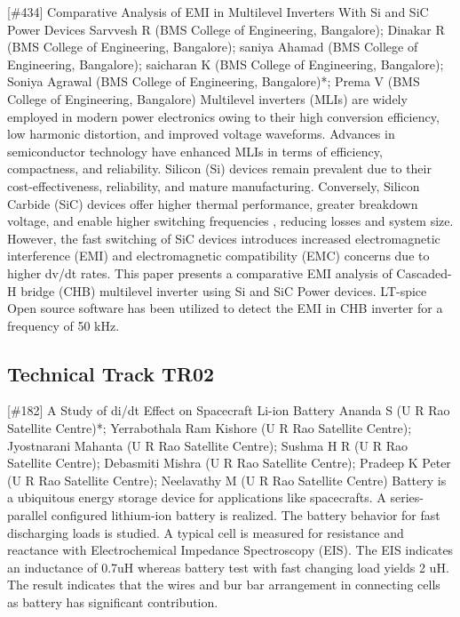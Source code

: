 {} \begin{abstract_online} {[\#434] Comparative Analysis of EMI in Multilevel Inverters With Si and SiC Power Devices} {} {Sarvvesh R (BMS College of Engineering, Bangalore); Dinakar R (BMS College of Engineering, Bangalore); saniya Ahamad (BMS College of Engineering, Bangalore); saicharan K (BMS College of Engineering, Bangalore); Soniya  Agrawal (BMS College of Engineering, Bangalore)*; Prema V (BMS College of Engineering, Bangalore)} {} Multilevel inverters (MLIs) are widely employed in modern power electronics owing to their high conversion efficiency, low harmonic distortion, and improved voltage waveforms. Advances in semiconductor technology have enhanced MLIs in terms of efficiency, compactness, and reliability. Silicon (Si) devices remain prevalent due to their cost-effectiveness, reliability, and mature manufacturing. Conversely, Silicon Carbide (SiC) devices offer higher thermal performance, greater breakdown voltage, and enable higher switching frequencies , reducing losses and system size. However, the fast switching of SiC devices introduces increased electromagnetic interference (EMI) and electromagnetic compatibility (EMC) concerns due to higher dv/dt rates. This paper presents a comparative EMI analysis of Cascaded-H bridge (CHB) multilevel inverter using Si and SiC Power devices. LT-spice Open source software has been utilized to detect the EMI in CHB inverter for a frequency of 50 kHz. \end{abstract_online} 
\clearpage \subsection{Technical Track TR02}\nopagebreak {} \begin{abstract_online} {[\#182] A Study of di/dt Effect on Spacecraft Li-ion Battery} {} {Ananda S (U R Rao Satellite Centre)*; Yerrabothala Ram Kishore (U R Rao Satellite Centre); Jyostnarani Mahanta (U R Rao Satellite Centre); Sushma H R (U R Rao Satellite Centre); Debasmiti Mishra (U R Rao Satellite Centre); Pradeep K Peter (U R Rao Satellite Centre); Neelavathy M (U R Rao Satellite Centre)} {} Battery is a ubiquitous energy storage device for applications like spacecrafts. A series-parallel configured lithium-ion battery is realized. The battery behavior for fast discharging loads is studied. A typical cell is measured for resistance and reactance with Electrochemical Impedance Spectroscopy (EIS). The EIS indicates an inductance of 0.7uH whereas battery test with fast changing load yields 2 uH. The result indicates that the wires and bur bar arrangement in connecting cells as battery has significant contribution. \end{abstract_online} 
